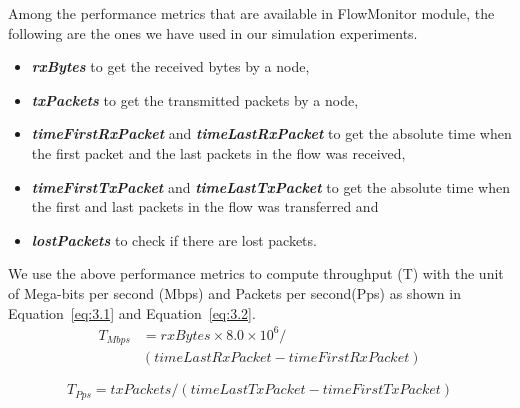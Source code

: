 Among the performance metrics that are available in FlowMonitor module, the following are the ones we have used in our simulation experiments.

\begin{itemize}
	\item \textbf{\textit{rxBytes}} to get the received bytes by a node,
	\item \textbf{\textit{txPackets}} to get the transmitted packets by a node,
	\item \textbf{\textit{timeFirstRxPacket}} and \textbf{\textit{timeLastRxPacket}} to get the absolute time when the first packet and the last packets in the flow was received,
	\item  \textbf{\textit{timeFirstTxPacket}} and \textbf{\textit{timeLastTxPacket}} to get the absolute time when the first and last packets in the flow was transferred and 
	\item \textbf{\textit{lostPackets}} to check if there are lost packets.
\end{itemize}

We use the above performance metrics to compute throughput (T) with the unit of Mega-bits per second (Mbps) and Packets per second(Pps) as shown in Equation~\ref{eq:3.1} and Equation~\ref{eq:3.2}. 
\begin{equation} \label{eq:3.1}
\begin{split}
T_{Mbps} &= rxBytes \times 8.0 \times 10^6 /\\
  & (timeLastRxPacket - timeFirstRxPacket)
\end{split}
\end{equation}

\begin{equation} \label{eq:3.2}
T_{Pps} = txPackets / (timeLastTxPacket - timeFirstTxPacket)
\end{equation}
